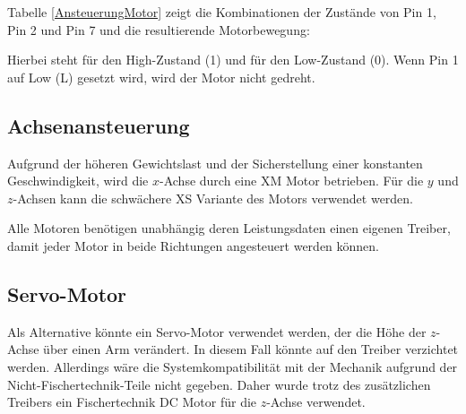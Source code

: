 \documentclass[conference,compsoc,final,a4paper]{IEEEtran}
\begin{document}
\noindent Tabelle \ref{AnsteuerungMotor} zeigt die Kombinationen der Zustände von Pin 1, Pin 2 und Pin 7 und die resultierende Motorbewegung:

\noindent Hierbei steht \grqq{} für den High-Zustand (1) und \grqq{} für den Low-Zustand (0). Wenn Pin 1 auf Low (L) gesetzt wird, wird der Motor nicht gedreht.

\subsection{Achsenansteuerung}

Aufgrund der höheren Gewichtslast und der Sicherstellung einer konstanten Geschwindigkeit, wird die $x$-Achse durch eine XM Motor betrieben.
Für die $y$ und $z$-Achsen kann die schwächere XS Variante des Motors verwendet werden.

Alle Motoren benötigen unabhängig deren Leistungsdaten einen eigenen Treiber, damit jeder Motor in beide Richtungen angesteuert werden können.

\subsection{Servo-Motor}

Als Alternative könnte ein Servo-Motor verwendet werden, der die Höhe der $z$-Achse über einen Arm verändert. 
In diesem Fall könnte auf den Treiber verzichtet werden. Allerdings wäre die Systemkompatibilität mit der Mechanik aufgrund der Nicht-Fischertechnik-Teile nicht gegeben. 
Daher wurde trotz des zusätzlichen Treibers ein Fischertechnik DC Motor für die $z$-Achse verwendet.
\end{document}
